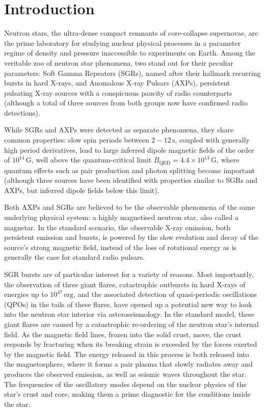 \documentclass[12pt]{emulateapj}
\begin{document}
\section{Introduction}

Neutron stars, the ultra-dense compact remnants of core-collapse supernovae, are the prime laboratory for studying nuclear 
physical processes in a parameter regime of density and pressure inaccessible to experiments on Earth. 
Among the veritable zoo of neutron star phenomena, two stand out for their peculiar parameters: Soft Gamma Repeaters (SGRs),
named after their hallmark recurring bursts in hard X-rays, and Anomalous X-ray Pulsars (AXPs), persistent pulsating X-ray
sources with a conspicuous paucity of radio counterparts (although a total of three sources from both groups now
have confirmed radio detections). 

While SGRs and AXPs were detected as separate phenomena, they share common properties: slow spin periods between
$2 - 12 \, \mathrm{s}$, coupled with generally high period derivatives, lead to large inferred dipole magnetic fields of
the order of $10^{14} \, \mathrm{G}$, well above the quantum-critical limit $B_{\mathrm{QED}} = 4.4 \times 10^{13} \, \mathrm{G}$,
where quantum effects such as pair production and photon splitting become important (although three sources have been 
identified with properties similar to SGRs and AXPs, but inferred dipole fields below this limit). 

Both AXPs and SGRs are believed to be the observable phenomena of the same underlying physical system: a highly magnetised
neutron star, also called a magnetar. In the standard scenario, the observable X-ray emission, both persistent emission and bursts, 
is powered by the slow evolution and decay of the source's strong magnetic field, instead of the loss of rotational energy as 
is generally the case for standard radio pulsars. 

SGR bursts are of particular interest for a variety of reasons. Most importantly, the observation of three giant flares, catastrophic
outbursts in hard X-rays of energies up to $10^{47} \, \mathrm{erg}$, and the associated detection of quasi-periodic oscillations (QPOs)
in the tails of these flares, have opened up a potential new way to look into the neutron star interior via asteroseismology. In the standard 
model, these giant flares are caused by a catastrophic re-ordering of the neutron star's internal field. As the magnetic field lines, frozen into
the solid crust, move, the crust responds by fracturing when its breaking strain is exceeded by the forces exerted by the magnetic field.
The energy released in this process is both released into the magnetosphere, where it forms a pair plasma that slowly radiates away and
produces the observed emission, as well as seismic waves throughout the star. The frequencies of the oscillatory modes depend on
the nuclear physics of the star's crust and core, making them a prime diagnostic for the conditions inside the star.
\end{document}
